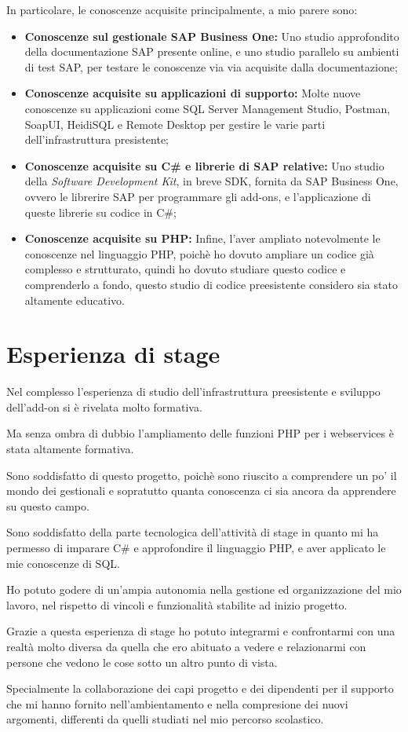 In particolare, le conoscenze acquisite principalmente, a mio parere sono:
\begin{itemize}
    \item \textbf{Conoscenze sul gestionale SAP Business One: }Uno studio approfondito della documentazione SAP presente online, e uno studio parallelo su ambienti di test SAP, per testare le conoscenze via via acquisite dalla documentazione;
    \item \textbf{Conoscenze acquisite su applicazioni di supporto: } Molte nuove conoscenze su applicazioni come SQL Server Management Studio, Postman, SoapUI, HeidiSQL e Remote Desktop per gestire le varie parti dell'infrastruttura presistente;
    \item \textbf{Conoscenze acquisite su C\# e librerie di SAP relative: } Uno studio della \textit{Software Development Kit}, in breve SDK, fornita da SAP Business One, ovvero le librerire SAP per programmare gli add-ons, e l'applicazione di queste librerie su codice in C\#;
    \item \textbf{Conoscenze acquisite su PHP: } Infine, l'aver ampliato notevolmente le conoscenze nel linguaggio PHP, poichè ho dovuto ampliare un codice già complesso e strutturato, quindi ho dovuto studiare questo codice e comprenderlo a fondo, questo studio di codice preesistente considero sia stato altamente educativo.
\end{itemize}

\section{Esperienza di stage}
Nel complesso l'esperienza di studio dell'infrastruttura preesistente e sviluppo dell'add-on si è rivelata molto formativa.

Ma senza ombra di dubbio l'ampliamento delle funzioni PHP per i webservices è stata altamente formativa.

\newspace

Sono soddisfatto di questo progetto, poichè sono riuscito a comprendere un po' il mondo dei gestionali e sopratutto quanta conoscenza ci sia ancora da apprendere su questo campo.

Sono soddisfatto della parte tecnologica dell'attività di stage in quanto mi ha permesso di imparare C\# e approfondire il linguaggio PHP, e aver applicato le mie conoscenze di SQL.

\newspace

Ho potuto godere di un'ampia autonomia nella gestione ed organizzazione del mio lavoro, nel rispetto di vincoli e funzionalità stabilite ad inizio progetto.

Grazie a questa esperienza di stage ho potuto integrarmi e confrontarmi con una realtà molto diversa da quella che ero abituato a vedere e relazionarmi con persone che vedono le cose sotto un altro punto di vista.

Specialmente la collaborazione dei capi progetto e dei dipendenti per il supporto che mi hanno fornito nell'ambientamento e nella compresione dei nuovi argomenti, differenti da quelli studiati nel mio percorso scolastico.
